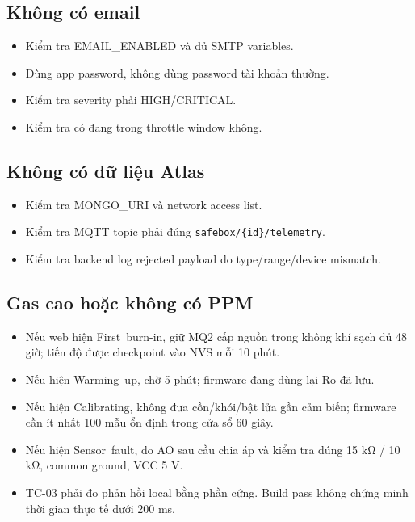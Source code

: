 \documentclass[11pt,oneside,openany]{book}
\renewcommand{\texttt}[1]{{\ttfamily\small #1}}
\providecommand{\tightlist}{\setlength{\itemsep}{1pt}\setlength{\parskip}{0pt}}
\begin{document}
\subsection{Không có email}\label{khuxf4ng-cuxf3-email}

\begin{itemize}
\tightlist
\item
  Kiểm tra \texttt{EMAIL\_ENABLED} và đủ SMTP variables.
\item
  Dùng app password, không dùng password tài khoản thường.
\item
  Kiểm tra severity phải HIGH/CRITICAL.
\item
  Kiểm tra có đang trong throttle window không.
\end{itemize}

\subsection{Không có dữ liệu
Atlas}\label{khuxf4ng-cuxf3-dux1eef-liux1ec7u-atlas}

\begin{itemize}
\tightlist
\item
  Kiểm tra MONGO\_URI và network access list.
\item
  Kiểm tra MQTT topic phải đúng \nolinkurl{safebox/{id}/telemetry}.
\item
  Kiểm tra backend log rejected payload do type/range/device mismatch.
\end{itemize}

\subsection{Gas cao hoặc không có
PPM}\label{gas-cao-houx1eb7c-khuxf4ng-cuxf3-ppm}

\begin{itemize}
\tightlist
\item
  Nếu web hiện \texttt{First\ burn-in}, giữ MQ2 cấp nguồn trong không
  khí sạch đủ 48 giờ; tiến độ được checkpoint vào NVS mỗi 10 phút.
\item
  Nếu hiện \texttt{Warming\ up}, chờ 5 phút; firmware đang dùng lại
  \texttt{Ro} đã lưu.
\item
  Nếu hiện \texttt{Calibrating}, không đưa cồn/khói/bật lửa gần cảm
  biến; firmware cần ít nhất 100 mẫu ổn định trong cửa sổ 60 giây.
\item
  Nếu hiện \texttt{Sensor\ fault}, đo AO sau cầu chia áp và kiểm tra
  đúng 15 kΩ / 10 kΩ, common ground, VCC 5 V.
\item
  TC-03 phải đo phản hồi local bằng phần cứng. Build pass không chứng
  minh thời gian thực tế dưới 200 ms.
\end{itemize}
\end{document}
